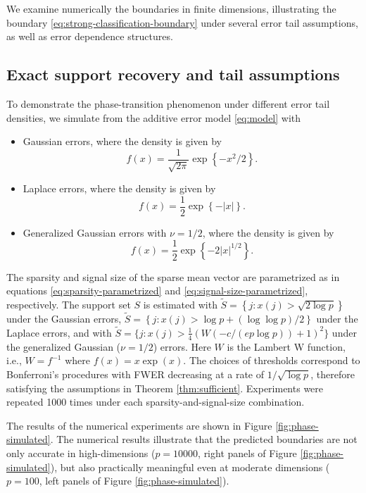 
We examine numerically the boundaries in finite dimensions, illustrating the boundary \eqref{eq:strong-classification-boundary} under several error tail assumptions, as well as error dependence structures.

\subsection{Exact support recovery and tail assumptions}

To demonstrate the phase-transition phenomenon under different error tail densities, we simulate from the additive error model \eqref{eq:model} with
\begin{itemize}
    \item Gaussian errors, where the density is given by
    $$f(x) = \frac{1}{\sqrt{2\pi}}\exp{\left\{-x^2/2\right\}}.$$
    \item Laplace errors, where the density is given by $$f(x) = \frac{1}{2}\exp{\left\{-\left|x\right|\right\}}.$$
    \item Generalized Gaussian errors with $\nu=1/2$, where the density is given by 
    $$f(x) = \frac{1}{2}\exp{\left\{-2\left|x\right|^{1/2}\right\}}.$$
\end{itemize}
The sparsity and signal size of the sparse mean vector are parametrized as in equations \eqref{eq:sparsity-parametrized} and \eqref{eq:signal-size-parametrized}, respectively.
The support set $S$ is estimated with 
$\widetilde{S} = \left\{j:x(j)>\sqrt{2\log{p}}\right\}$ 
under the Gaussian errors, 
$\widetilde{S} = \left\{j:x(j)>\log{p} + (\log{\log{p}})/2\right\}$ 
under the Laplace errors, and with
$\widetilde{S} = \{j:x(j)> \frac{1}{4}\left(W\left(-c/(ep\log{p})\right) + 1\right)^2\}$
under the generalized Gaussian ($\nu = 1/2$) errors. Here $W$ is the Lambert W function, i.e., $W=f^{-1}$ where $f(x)=x\exp{(x)}$.
The choices of thresholds correspond to Bonferroni's procedures with FWER decreasing at a rate of $1/\sqrt{\log{p}}$, therefore satisfying the assumptions in Theorem \ref{thm:sufficient}.
Experiments were repeated 1000 times under each sparsity-and-signal-size combination.

The results of the numerical experiments are shown in Figure \ref{fig:phase-simulated}.
The numerical results illustrate that the predicted boundaries are not only accurate in high-dimensions ($p=10000$, right panels of Figure \ref{fig:phase-simulated}), but also practically meaningful even at moderate dimensions ($p=100$, left panels of Figure \ref{fig:phase-simulated}).

